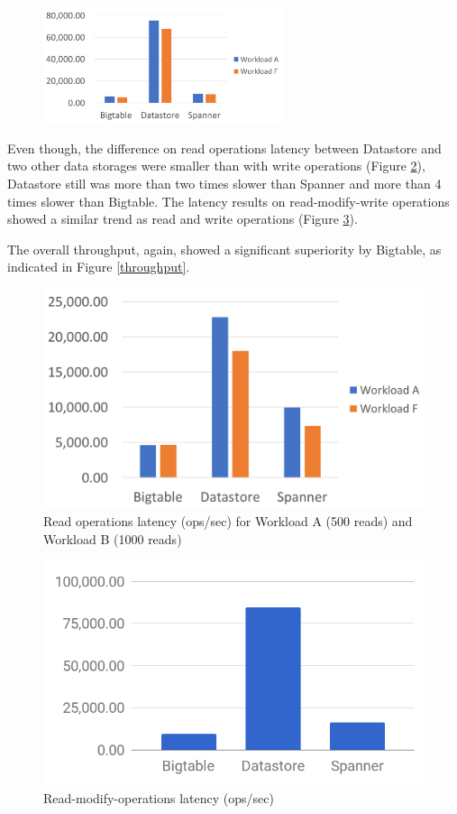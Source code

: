 \documentclass[bsc,frontabs,twoside,singlespacing,parskip,deptreport]{infthesis}     %
\begin{document}
\begin{figure}
	\centering
	\includegraphics[width=7cm]{write-latency}
	\caption{}
	\label{write-latency}
\end{figure}

Even though, the difference on read operations latency between Datastore and two other data storages were smaller than with write operations (Figure \ref{read-latency}), Datastore still was more than two times slower than Spanner and more than 4 times slower than Bigtable. The latency results on read-modify-write operations showed a similar trend as read and write operations (Figure \ref{read-modify-write-latency}). 

The overall throughput, again, showed a significant superiority by Bigtable, as indicated in Figure \ref{throughput}. 


\begin{figure}[h]
	\centering
	\includegraphics[width=12cm]{read-latency}
	\caption{Read operations latency (ops/sec) for Workload A (500 reads) and Workload B (1000 reads)}
	\label{read-latency}
\end{figure}

\begin{figure}[h]
	\centering
	\includegraphics[width=13cm]{read-modify-write-latency}
	\caption{Read-modify-operations latency (ops/sec)}
	\label{read-modify-write-latency}
\end{figure}
\end{document}
